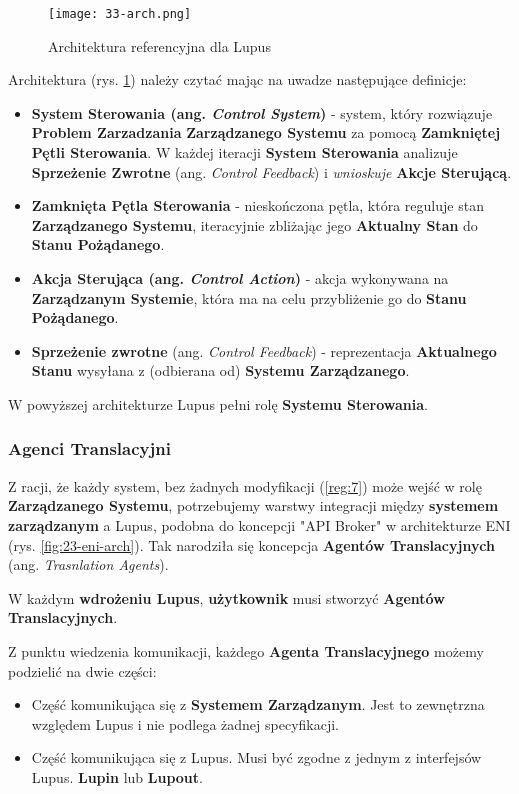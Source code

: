 \begin{figure}[!h]
    \centering \texttt{[image: 33-arch.png]}
    \caption{Architektura referencyjna dla Lupus}\label{fig:33-arch}
\end{figure}

Architektura (rys. \ref{fig:33-arch}) należy czytać mając na uwadze następujące definicje:

\begin{itemize}
    \item \textbf{System Sterowania (ang. \textit{Control System})} - system, który rozwiązuje \textbf{Problem Zarzadzania} \textbf{Zarządzanego Systemu} za pomocą \textbf{Zamkniętej Pętli Sterowania}. W każdej iteracji \textbf{System Sterowania} analizuje \textbf{Sprzeżenie Zwrotne} (ang. \textit{Control Feedback}) i \textit{wnioskuje} \textbf{Akcje Sterującą}.
    \item \textbf{Zamknięta Pętla Sterowania} - nieskończona pętla, która reguluje stan \textbf{Zarządzanego Systemu}, iteracyjnie zbliżając jego \textbf{Aktualny Stan} do \textbf{Stanu Pożądanego}. 
    \item \textbf{Akcja Sterująca (ang. \textit{Control Action})} - akcja wykonywana na \textbf{Zarządzanym Systemie}, która ma na celu przybliżenie go do \textbf{Stanu Pożądanego}.
    \item \textbf{Sprzeżenie zwrotne} (ang. \textit{Control Feedback}) - reprezentacja \textbf{Aktualnego Stanu} wysyłana z (odbierana od) \textbf{Systemu Zarządzanego}.
\end{itemize}

W powyższej architekturze Lupus pełni rolę \textbf{Systemu Sterowania}.

\subsubsection{Agenci Translacyjni}
Z racji, że każdy system, bez żadnych modyfikacji (\ref{reg:7}) może wejść w rolę \textbf{Zarządzanego Systemu}, potrzebujemy warstwy integracji między \textbf{systemem zarządzanym} a Lupus, podobna do koncepcji "API Broker" w architekturze ENI (rys. \ref{fig:23-eni-arch}). Tak narodziła się koncepcja \textbf{Agentów Translacyjnych} (ang. \textit{Trasnlation Agents}). 

W każdym \textbf{wdrożeniu Lupus}, \textbf{użytkownik} musi stworzyć \textbf{Agentów Translacyjnych}. 

Z punktu wiedzenia komunikacji, każdego \textbf{Agenta Translacyjnego} możemy podzielić na dwie części:
\begin{itemize}
    \item Część komunikująca się z \textbf{Systemem Zarządzanym}. Jest to zewnętrzna względem Lupus i nie podlega żadnej specyfikacji.
    \item Część komunikująca się z Lupus. Musi być zgodne z jednym z interfejsów Lupus. \textbf{Lupin} lub \textbf{Lupout}.
\end{itemize}

